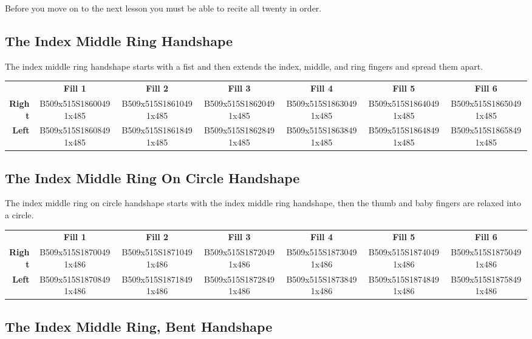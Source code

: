 \documentclass{article}
\begin{document}
Before you move on to the next lesson you must be able to recite all twenty in order.

\subsection{The Index Middle Ring Handshape}

The index middle ring handshape starts with a fist and then extends the index, middle, and ring fingers and spread them apart.

\begin{center}
\begin{tabular}{r*{6}{c}}
&\textbf{Fill 1}&\textbf{Fill 2}&\textbf{Fill 3}&\textbf{Fill 4}&\textbf{Fill 5}&\textbf{Fill 6}\\
\textbf{Right}&
B509x515S18600491x485&
B509x515S18610491x485&
B509x515S18620491x485&
B509x515S18630491x485&
B509x515S18640491x485&
B509x515S18650491x485\\
\textbf{Left}&
B509x515S18608491x485&
B509x515S18618491x485&
B509x515S18628491x485&
B509x515S18638491x485&
B509x515S18648491x485&
B509x515S18658491x485\\
\end{tabular}
\end{center}

\subsection{The Index Middle Ring On Circle Handshape}

The index middle ring on circle handshape starts with the index middle ring handshape, then the thumb and baby fingers are relaxed into a circle.

\begin{center}
\begin{tabular}{r*{6}{c}}
&\textbf{Fill 1}&\textbf{Fill 2}&\textbf{Fill 3}&\textbf{Fill 4}&\textbf{Fill 5}&\textbf{Fill 6}\\
\textbf{Right}&
B509x515S18700491x486&
B509x515S18710491x486&
B509x515S18720491x486&
B509x515S18730491x486&
B509x515S18740491x486&
B509x515S18750491x486\\
\textbf{Left}&
B509x515S18708491x486&
B509x515S18718491x486&
B509x515S18728491x486&
B509x515S18738491x486&
B509x515S18748491x486&
B509x515S18758491x486\\
\end{tabular}
\end{center}

\subsection{The Index Middle Ring, Bent Handshape}
\end{document}
